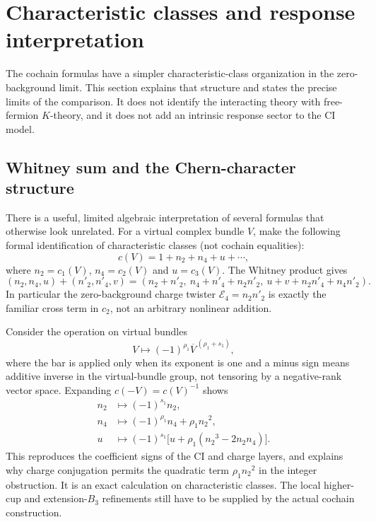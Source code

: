 \section{Characteristic classes and response interpretation}\label{sec:response}
The cochain formulas have a simpler characteristic-class organization in the zero-background limit. This section explains that structure and states the precise limits of the comparison. It does not identify the interacting theory with free-fermion $K$-theory, and it does not add an intrinsic response sector to the CI model.
\subsection{Whitney sum and the Chern-character structure}
There is a useful, limited algebraic interpretation of several formulas that otherwise look unrelated. For a virtual complex bundle $V$, make the following formal identification of characteristic classes (not cochain equalities):
\begin{equation}
 c(V)=1+{n_2}+{n_4}+u+\cdots,
\end{equation}
where ${n_2}=c_1(V)$, ${n_4}=c_2(V)$ and $u=c_3(V)$. The Whitney product gives
\begin{equation}\label{eq:Whitney06}
 ({n_2},{n_4},u)+({n'_2},{n'_4},v)=({n_2}+{n'_2},\ {n_4}+{n'_4}+{n_2}{n'_2},\ u+v+{n_2}{n'_4}+{n_4}{n'_2}).
\end{equation}
In particular the zero-background charge twister $\mathcal E_4={n_2}{n'_2}$ is exactly the familiar cross term in $c_2$, not an arbitrary nonlinear addition.

Consider the operation on virtual bundles
\begin{equation}
                 V\longmapsto(-1)^{\rho_1}\overline V^{\,({\rho_1}+{s_1})},
\end{equation}
where the bar is applied only when its exponent is one and a minus sign means additive inverse in the virtual-bundle group, not tensoring by a negative-rank vector space. Expanding $c(-V)=c(V)^{-1}$ shows
\begin{align}\label{eq:virtual-action06}
 {n_2}&\longmapsto(-1)^{s_1} {n_2},\\
 {n_4}&\longmapsto(-1)^{\rho_1} {n_4}+{\rho_1}{n_2}^2,\\
 u&\longmapsto(-1)^{s_1}\big[u+{\rho_1}({n_2}^3-2{n_2}{n_4})\big].
\end{align}
This reproduces the coefficient signs of the CI and charge layers, and explains why charge conjugation permits the quadratic term ${\rho_1}{n_2}^2$ in the integer obstruction. It is an exact calculation on characteristic classes. The local higher-cup and extension-$B_3$ refinements still have to be supplied by the actual cochain construction.

